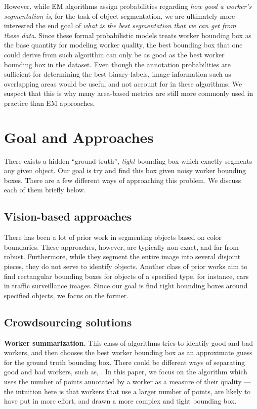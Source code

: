 \documentclass[letterpaper]{article} %
\begin{document}
\par However, while EM algorithms assign probabilities regarding  \textit{how good a worker's segmentation is}, for the task of object segmentation, we are ultimately more interested the end goal of \textit{what is the best segmentation that we can get from these data}. 
Since these formal probabilistic models treats worker bounding box as the base quantity for modeling worker quality, the best bounding box that one could derive from such algorithm can only be as good as the best worker bounding box in the dataset.  Even though the annotation probabilities are sufficient for determining the best binary-labels, image information such as overlapping areas would be useful and not account for in these algorithms. We suspect that this is why many area-based metrics are still more commonly used in practice than EM approaches.

\section{Goal and Approaches}
There exists a hidden ``ground truth'', {\em tight} bounding box which exactly segments any given object. Our goal is try and find this box given noisy worker bounding boxes. There are a few different ways of approaching this problem. We discuss each of them briefly below.

\subsection{Vision-based approaches}
There has been a lot of prior work in segmenting objects based on color boundaries. These approaches, however, are typically non-exact, and far from robust. Furthermore, while they segment the entire image into several disjoint pieces, they do not serve to identify objects. Another class of prior works aim to find rectangular bounding boxes for objects of a specified type, for instance, cars in traffic surveillance images. Since our goal is find tight bounding boxes around specified objects, we focus on the former.

\subsection{Crowdsourcing solutions}
\smallskip
\noindent
{\bf Worker summarization.}
This class of algorithms tries to identify good and bad workers, and then chooses the best worker bounding box as an approximate guess for the ground truth bounding box. There could be different ways of separating good and bad workers, such as, . In this paper, we focus on the algorithm which uses the number of points annotated by a worker as a measure of their quality --- the intuition here is that workers that use a larger number of points, are likely to have put in more effort, and drawn a more complex and tight bounding box.
\end{document}
